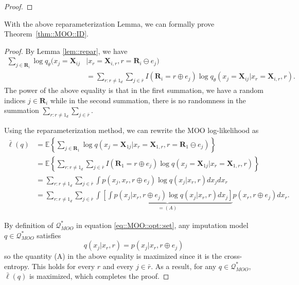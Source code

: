 \documentclass[aos, preprint]{imsart}
\theoremstyle{plain}
\theoremstyle{definition}
\newcommand{\E}{\mbox{$\mathbb{E}$}}
\newcommand{\bX}{\mathbf{X}}
\newcommand{\bR}{\mathbf{R}}
\begin{document}
\begin{appendix}
\begin{proof}


\end{proof}

With the above reparameterization Lemma, we can formally prove Theorem~\ref{thm::MOO::ID}. 

\begin{proof}
By Lemma \ref{lem::repar}, we have
\begin{align*}
\sum_{j \in \bR_i} \log q_\theta(x_j = \bX_{ij}&|x_{r} = \bX_{i, r}, r = \bR_i\ominus e_j)\\
& = \sum_{r:r\neq 1_d}    \sum_{j \in \bar r} I(\bR_i = r\oplus e_j)\log q_\theta(x_j = \bX_{ij}|x_{r} = \bX_{i,r}, r) .
\end{align*}
The power of the above equality is that 
in the first summation, we have a random indices $j\in\bR_i$
while in the second summation, there is no randomness in the summation $\sum_{r:r\neq 1_d}    \sum_{j \in \bar r}$. 


Using the reparameterization method,
we can rewrite the MOO log-likelihood as
\begin{align*}
\bar \ell(q) & = \E\left\{\sum_{j \in \bR_1} \log q(x_j = \bX_{1j}|x_{r} = \bX_{1, r}, r = \bR_1\ominus e_j)\right\}\\
&= \E\left\{ \sum_{r:r\neq 1_d}  \sum_{j \in \bar r} I(\bR_1 = r\oplus e_j)\log q(x_j = \bX_{1j}|x_{r} = \bX_{1,r}, r) \right\}\\
& = \sum_{r:r\neq 1_d} \sum_{j\in \bar r}  \int p(x_{j}, x_r, r\oplus e_j)\log q(x_j |x_{r}, r) dx_j dx_r\\
& = \sum_{r:r\neq 1_d} \sum_{j\in \bar r}\int  \underbrace{\left[\int p(x_{j}| x_r, r\oplus e_j)\log q(x_j |x_{r}, r) dx_j\right]}_{= (A)}  p(x_r, r\oplus e_j)dx_r.
\end{align*}

By definition of $\mathcal{Q}^*_{MOO}$ in equation \eqref{eq::MOO::opt::set}, 
any imputation model $q\in \mathcal{Q}^*_{MOO}$ satisfies
$$
q(x_j|x_r, r) = p(x_j|x_r, r\oplus e_j)
$$
so the quantity (A) in the above equality 
is maximized since it is the cross-entropy.
This holds for every $r$ and every $j\in \bar r$.
As a result, for any $q\in \mathcal{Q}^*_{MOO}$, $\bar \ell(q)$ is maximized, which completes the proof.
\end{proof}



\end{appendix}
\end{document}
